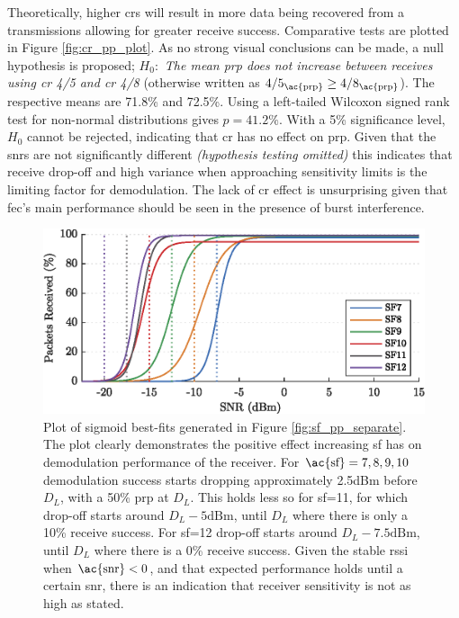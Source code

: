 Theoretically, higher \ac{cr}s will result in more data being recovered from a transmissions allowing for greater receive success. Comparative tests are plotted in Figure \ref{fig:cr_pp_plot}. As no strong visual conclusions can be made, a null hypothesis is proposed; $H_{0} : $ \textit{The mean \ac{prp} does not increase between receives using \ac{cr} 4/5 and \ac{cr} 4/8} (otherwise written as $4/5_{\text{\ac{prp}}} \geq 4/8_{\text{\ac{prp}}}$). The respective means are 71.8\% and 72.5\%. Using a left-tailed Wilcoxon signed rank test for non-normal distributions gives $p=41.2\%$. With a 5\% significance level,  $H_{0}$ cannot be rejected, indicating that \ac{cr} has no effect on \ac{prp}.  Given that the \ac{snr}s are not significantly different \textit{(hypothesis testing omitted)} this indicates that receive drop-off and high variance when approaching sensitivity limits is the limiting factor for demodulation. The lack of \ac{cr} effect is unsurprising given that \ac{fec}'s main performance should be seen in the presence of burst interference.

\begin{figure}[H]
    \centering
   	\includegraphics{Figures/sf_fit_plot}
    \caption[Sigmoid best-fits for \ac{snr} vs \ac{prp}]{
    Plot of sigmoid best-fits generated in Figure \ref{fig:sf_pp_separate}. The plot clearly demonstrates the positive effect increasing \ac{sf} has on demodulation performance of the receiver. For $\text{\ac{sf}}=7,8,9,10$ demodulation success starts dropping approximately 2.5dBm before $D_L$, with a 50\% \ac{prp} at $D_L$. This holds less so for \ac{sf}=11, for which drop-off starts around $D_L - 5\text{dBm}$, until $D_L$ where there is only a 10\% receive success. For \ac{sf}=12 drop-off starts around $D_L - 7.5\text{dBm}$, until $D_L$ where there is a 0\% receive success. Given the stable \ac{rssi} when $\text{\ac{snr}} < 0$, and that expected performance holds until a certain \ac{snr}, there is an indication that receiver sensitivity is not as high as stated.
     }
    \label{fig:sf_pp_fit}
\end{figure}

